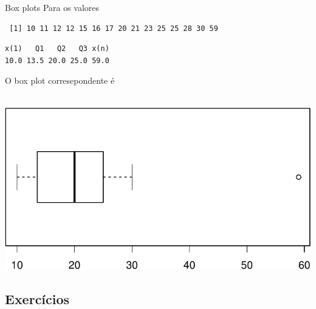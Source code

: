 \documentclass[10pt]{beamer}\usepackage[]{graphicx}\usepackage[]{color}
\makeatletter
\newenvironment{kframe}{%
 \def\at@end@of@kframe{}%
 \ifinner\ifhmode%
  \def\at@end@of@kframe{\end{minipage}}%
  \begin{minipage}{\columnwidth}%
 \fi\fi%
 \def\FrameCommand##1{\hskip\@totalleftmargin \hskip-\fboxsep
 \colorbox{shadecolor}{##1}\hskip-\fboxsep
     \hskip-\linewidth \hskip-\@totalleftmargin \hskip\columnwidth}%
 \MakeFramed {\advance\hsize-\width
   \@totalleftmargin\z@ \linewidth\hsize
   \@setminipage}}%
 {\par\unskip\endMakeFramed%
 \at@end@of@kframe}
\newenvironment{knitrout}{}{} %
\theoremstyle{definition}
\makeatother
\begin{document}
\begin{frame}[fragile]{Box plots}
Para os valores
\begin{knitrout}\footnotesize
{}\color{fgcolor}\begin{kframe}
\begin{verbatim}
 [1] 10 11 12 12 15 16 17 20 21 23 25 25 28 30 59
\end{verbatim}
\end{kframe}
\end{knitrout}
\begin{knitrout}\footnotesize
{}\color{fgcolor}\begin{kframe}
\begin{verbatim}
x(1)   Q1   Q2   Q3 x(n) 
10.0 13.5 20.0 25.0 59.0 
\end{verbatim}
\end{kframe}
\end{knitrout}
O box plot corresepondente é \\~\\
\begin{knitrout}\footnotesize
{}\color{fgcolor}

{\centering \includegraphics[width=.6\textwidth]{figure/unnamed-chunk-23-1} 

}



\end{knitrout}
\end{frame}

\subsection{Exercícios}
\end{document}
